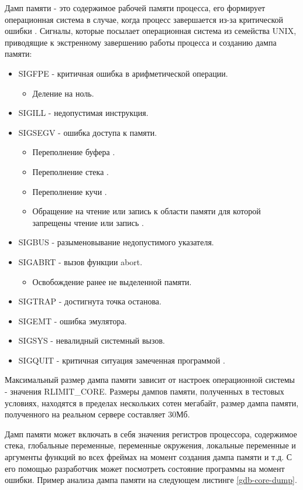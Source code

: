 \documentclass[20pt]{article}
\begin{document}
Дамп памяти \cite{wiki/coredump} - это содержимое рабочей памяти процесса, его
формирует операционная система в случае, когда процесс завершается из-за
критической ошибки \cite{core-dump-signals} \cite{error-types}. Сигналы, которые
посылает операционная система из семейства UNIX, приводящие к экстренному завершению
работы процесса и созданию дампа памяти:
\begin{itemize}
  \item SIGFPE - критичная ошибка в арифметической операции.
  \begin{itemize}
    \item Деление на ноль.
  \end{itemize}
  \item SIGILL - недопустимая инструкция.
  \item SIGSEGV - ошибка доступа к памяти.
    \begin{itemize}
      \item Переполнение буфера \cite{buffer-overflow}.
      \item Переполнение стека \cite{stack-overflow}.
      \item Переполнение кучи \cite{heap-overflow}.
      \item Обращение на чтение или запись к области памяти для которой запрещены
      чтение или запись \cite{memory-corruption}.
    \end{itemize}
  \item SIGBUS - разыменовывание недопустимого указателя.
  \item SIGABRT - вызов функции abort.
    \begin{itemize}
      \item Освобождение ранее не выделенной памяти.
    \end{itemize}
  \item SIGTRAP - достигнута точка останова.
  \item SIGEMT - ошибка эмулятора.
  \item SIGSYS - невалидный системный вызов.
  \item SIGQUIT - критичная ситуация замеченная программой \cite{sigquit}.
\end{itemize}

Максимальный размер дампа памяти зависит от настроек операционной системы -
значения RLIMIT\_CORE. Размеры дампов памяти, полученных в тестовых условиях,
находятся в пределах нескольких сотен мегабайт, размер дампа памяти, полученного
на реальном сервере составляет 30Мб.

Дамп памяти может включать в себя значения регистров процессора, содержимое стека,
глобальные переменные, переменные окружения, локальные переменные и аргументы
функций во всех фреймах на момент создания дампа памяти и т.д. С его помощью
разработчик может посмотреть состояние программы на момент ошибки. Пример анализа
дампа памяти на следующем листинге \ref{gdb-core-dump}.
\end{document}
